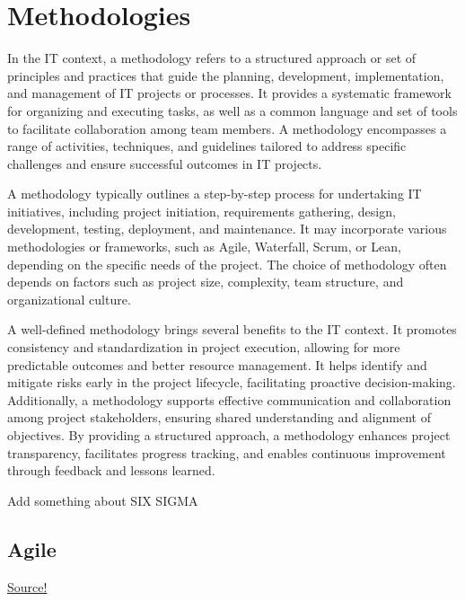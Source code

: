 \chapter{Methodologies}

In the IT context, a methodology refers to a structured approach or set of principles and practices that guide the planning, development, implementation, and management of IT projects or processes. It provides a systematic framework for organizing and executing tasks, as well as a common language and set of tools to facilitate collaboration among team members. A methodology encompasses a range of activities, techniques, and guidelines tailored to address specific challenges and ensure successful outcomes in IT projects.

A methodology typically outlines a step-by-step process for undertaking IT initiatives, including project initiation, requirements gathering, design, development, testing, deployment, and maintenance. It may incorporate various methodologies or frameworks, such as Agile, Waterfall, Scrum, or Lean, depending on the specific needs of the project. The choice of methodology often depends on factors such as project size, complexity, team structure, and organizational culture.

A well-defined methodology brings several benefits to the IT context. It promotes consistency and standardization in project execution, allowing for more predictable outcomes and better resource management. It helps identify and mitigate risks early in the project lifecycle, facilitating proactive decision-making. Additionally, a methodology supports effective communication and collaboration among project stakeholders, ensuring shared understanding and alignment of objectives. By providing a structured approach, a methodology enhances project transparency, facilitates progress tracking, and enables continuous improvement through feedback and lessons learned.

{\Large Add something about SIX SIGMA}

\section{Agile}

\href{https://www.atlassian.com/agile/manifesto}{Source!}\\

